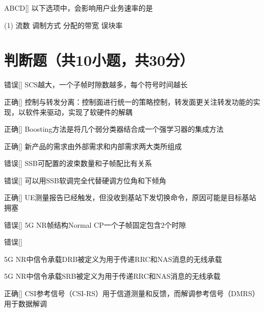 \begin{choice}{\;ABCD\;}[]
	以下选项中，会影响用户业务速率的是
	\begin{tasks}(1)
		\task 流数
		\task 调制方式
		\task 分配的带宽
		\task 误块率
	\end{tasks}
\end{choice}




\section{判断题（共10小题，共30分）}

\begin{choice}{\;错误\;}[]
	SCS越大，一个子帧时隙数越多，每个符号时间越长
\end{choice}


\begin{choice}{\;正确\;}[]
	控制与转发分离：控制面进行统一的策略控制，转发面更关注转发功能的实现，以软件来驱动，实现了软硬件的解耦
\end{choice}

\begin{choice}{\;正确\;}[]
	Boosting方法是将几个弱分类器结合成一个强学习器的集成方法
\end{choice}

\begin{choice}{\;正确\;}[]
	新产品的需求由外部需求和内部需求两大类所组成
\end{choice}

\begin{choice}{\;错误\;}[]
	SSB可配置的波束数量和子帧配比有关系
\end{choice}

\begin{choice}{\;错误\;}[]
	可以用SSB软调完全代替硬调方位角和下倾角

\end{choice}


\begin{choice}{\;正确\;}[]
	UE测量报告已经触发，但没收到基站下发切换命令，原因可能是目标基站拥塞

\end{choice}

\begin{choice}{\;错误\;}[]
	5G NR帧结构Normal CP一个子帧固定包含2个时隙

\end{choice}

\begin{choice}{\;错误\;}[]

	5G NR中信令承载DRB被定义为用于传递RRC和NAS消息的无线承载
\end{choice}

\begin{solution}
	5G NR中信令承载SRB被定义为用于传递RRC和NAS消息的无线承载
\end{solution}

\begin{choice}{\;正确\;}[]
	CSI参考信号（CSI-RS）用于信道测量和反馈，而解调参考信号（DMRS）用于数据解调

\end{choice}











